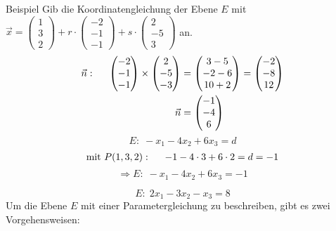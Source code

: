 \documentclass{article}
\begin{document}
\begin{boxx}[DarkBlue]{Beispiel}
    Gib die Koordinatengleichung der Ebene $E$ mit $\displaystyle \vec{x} = \begin{pmatrix}1\\3\\2\end{pmatrix} + r \cdot \begin{pmatrix}-2\\-1\\-1\end{pmatrix} + s \cdot \begin{pmatrix}2\\-5\\3\end{pmatrix}$ an.
    \begin{align*}
        \vec{n}:\hspace*{5mm} \begin{pmatrix}-2\\-1\\-1\end{pmatrix} \times \begin{pmatrix}2\\-5\\-3\end{pmatrix} &=  \begin{pmatrix}3-5\\-2-6\\10+2\end{pmatrix} =  \begin{pmatrix}-2\\-8\\12\end{pmatrix} \\
        \vec{n} &=  \begin{pmatrix}-1\\-4\\6\end{pmatrix}
    \end{align*}
    \[E:\; -x_1 - 4x_2 + 6x_3 = d\]
    \begin{align*}
        \text{mit }P(1,3,2):\hspace*{5mm} -1-4\cdot3+6\cdot2 = d = - 1
    \end{align*}
    \[\Rightarrow E:\; -x_1 - 4x_2 + 6x_3 = -1\]
\end{boxx}
\[E:\; 2x_1 - 3x_2 -x_3 = 8\]
Um die Ebene $E$ mit einer Parametergleichung zu beschreiben, gibt es zwei Vorgehensweisen:
\end{document}
